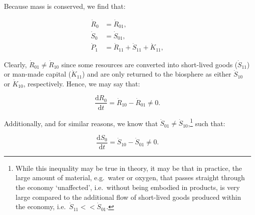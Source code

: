Because mass is conserved, we find that:

\begin{align} 
\label{eq:A_R0}
	\dot{R}_{0}				&
	= \dot{R}_{01},			\\
\label{eq:A_S0}
	\dot{S}_{0}				&
	= \dot{S}_{01},			\\
\label{eq:A_P1}
	\dot{P}_{1} 			&
	= \dot{R}_{11} 
	+ \dot{S}_{11}
	+ \dot{K}_{11},	
\end{align}



Clearly, $\dot{R}_{01} \neq \dot{R}_{10}$ 
since some resources are converted into
short-lived goods ($\dot{S}_{11}$) or man-made capital ($\dot{K}_{11}$)
and are only returned to the biosphere as either
$\dot{S}_{10}$ or $\dot{K}_{10}$, respectively. 
Hence,
we may say that:

\begin{equation}\label{eq:A_dR0_neq_0}
	\frac{\mathrm{d}R_0}{\mathrm{d}t}
	= \dot{R}_{10}
	- \dot{R}_{01}
	\neq 0.
\end{equation}

Additionally,
and for similar reasons, we know that
$\dot{S}_{01} \neq \dot{S}_{10}$,\footnote{While
this inequality may be true in theory,
it may be that in practice,
the large amount of material,
e.g.\ water or oxygen,
that passes straight through the economy `unaffected',
i.e.\ without being embodied in products,
is very large compared to the additional flow of short-lived goods
produced within the economy,
i.e.\ $\dot{S}_{11} << \dot{S}_{01}$.}
such that:

\begin{equation}\label{eq:A_dS0_neq_0}
	\frac{\mathrm{d}S_0}{\mathrm{d}t}
	= \dot{S}_{10}
	- \dot{S}_{01}
	\neq 0.
\end{equation}

